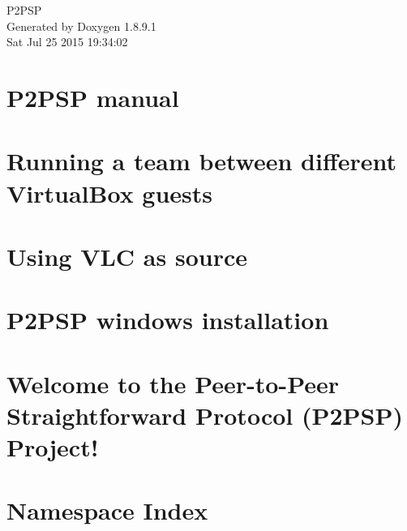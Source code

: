\documentclass[twoside]{book}
\newcommand{\+}{\discretionary{\mbox{\scriptsize$\hookleftarrow$}}{}{}}
\newcommand{\clearemptydoublepage}{%
  \newpage{\pagestyle{empty}\cleardoublepage}%
}
\begin{document}
\hypersetup{pageanchor=false,
             bookmarks=true,
             bookmarksnumbered=true,
             pdfencoding=unicode
            }
\begin{titlepage}
\vspace*{7cm}
\begin{center}%
{\Large P2\+P\+S\+P }\\
\vspace*{1cm}
{\large Generated by Doxygen 1.8.9.1}\\
\vspace*{0.5cm}
{\small Sat Jul 25 2015 19:34:02}\\
\end{center}
\end{titlepage}
\clearemptydoublepage
\tableofcontents
\clearemptydoublepage
{}
\hypersetup{pageanchor=true}

\chapter{P2\+P\+S\+P manual}
\label{md_doc_P2PSP}
\hypertarget{md_doc_P2PSP}{}

\chapter{Running a team between different Virtual\+Box guests}
\label{md_doc_VirtualBox}
\hypertarget{md_doc_VirtualBox}{}

\chapter{Using V\+L\+C as source}
\label{md_doc_VLC}
\hypertarget{md_doc_VLC}{}

\chapter{P2\+P\+S\+P windows installation}
\label{md_doc_windows}
\hypertarget{md_doc_windows}{}

\chapter{Welcome to the Peer-\/to-\/\+Peer Straightforward Protocol (P2\+P\+S\+P) Project!}
\label{md_README}
\hypertarget{md_README}{}

\chapter{Namespace Index}

\end{document}

